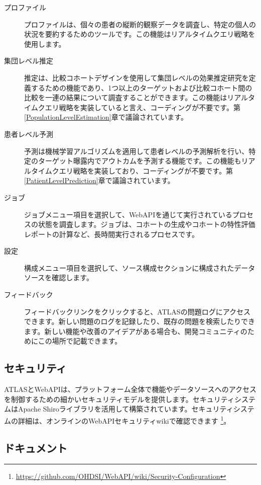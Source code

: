 \documentclass[
  11pt]{book}
\theoremstyle{definition}
\theoremstyle{definition}
\theoremstyle{definition}
\theoremstyle{definition}
\theoremstyle{remark}
\begin{document}
\begin{description}
\item[プロファイル ]
プロファイルは、個々の患者の縦断的観察データを調査し、特定の個人の状況を要約するためのツールです。この機能はリアルタイムクエリ戦略を使用します。
\item[集団レベル推定 ]
推定は、比較コホートデザインを使用して集団レベルの効果推定研究を定義するための機能であり、1つ以上のターゲットおよび比較コホート間の比較を一連の結果について調査することができます。この機能はリアルタイムクエリ戦略を実装していると言え、コーディングが不要です。第\ref{PopulationLevelEstimation}章で議論されています。
\item[患者レベル予測 ]
予測は機械学習アルゴリズムを適用して患者レベルの予測解析を行い、特定のターゲット曝露内でアウトカムを予測する機能です。この機能もリアルタイムクエリ戦略を実装しており、コーディングが不要です。第\ref{PatientLevelPrediction}章で議論されています。
\item[ジョブ ]
ジョブメニュー項目を選択して、WebAPIを通じて実行されているプロセスの状態を調査します。ジョブは、コホートの生成やコホートの特性評価レポートの計算など、長時間実行されるプロセスです。
\item[設定 ]
構成メニュー項目を選択して、ソース構成セクションに構成されたデータソースを確認します。
\item[フィードバック ]
フィードバックリンクをクリックすると、ATLASの問題ログにアクセスできます。新しい問題のログを記録したり、既存の問題を検索したりできます。新しい機能や改善のアイデアがある場合も、開発コミュニティのためにこの場所で記載できます。
\end{description}

\subsection{セキュリティ}\label{ux30bbux30adux30e5ux30eaux30c6ux30a3}

ATLASとWebAPIは、プラットフォーム全体で機能やデータソースへのアクセスを制御するための細かいセキュリティモデルを提供します。セキュリティシステムはApache Shiroライブラリを活用して構築されています。セキュリティシステムの詳細は、オンラインのWebAPIセキュリティwikiで確認できます \footnote{\url{https://github.com/OHDSI/WebAPI/wiki/Security-Configuration}}。 

\subsection{ドキュメント}\label{ux30c9ux30adux30e5ux30e1ux30f3ux30c8}
\end{document}
